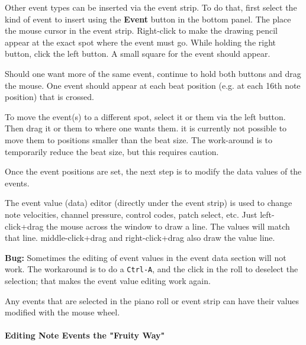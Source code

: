    Other event types can be inserted via the event strip.  To do that, first
   select the kind of event to insert using the \textbf{Event} button in the
   bottom panel.  The place the mouse cursor in the event strip.
   Right-click to make the drawing pencil appear at the exact spot where the
   event must go.  While holding the right button, click the left button.
   A small square for the event should appear.

   Should one want more of the same event, continue to hold both buttons and
   drag the mouse.  One event should appear at each beat position (e.g. at
   each 16th note position) that is crossed.

   To move the event(s) to a different spot, select it or them via the left
   button.  Then drag it or them to where one wants them.
   it is currently not possible to move them to positions smaller than the
   beat size.  The work-around is to temporarily reduce the beat size,
   but this requires caution.

   Once the event positions are set, the next step is to modify the
   data values of the events.

	The event value (data) editor (directly under the event strip) is used 
	to change note velocities, channel pressure, control codes,
	patch select, etc.
   Just left-click+drag the mouse across the window to draw a line.  The
   values will match that line.  
   middle-click+drag and right-click+drag also
   draw the value line.

   \textbf{Bug:}
   Sometimes the editing of event values in the event data section will not work.
   The workaround is to do a \texttt{Ctrl-A}, and the click in the roll
   to deselect the selection; that makes the event value editing work again.
   
   Any events that are selected in the piano roll or event strip can have
   their values modified with the mouse wheel.

\paragraph{Editing Note Events the "Fruity Way"}
\label{paragraph:seq64_pattern_editor_note_events_fruity}

